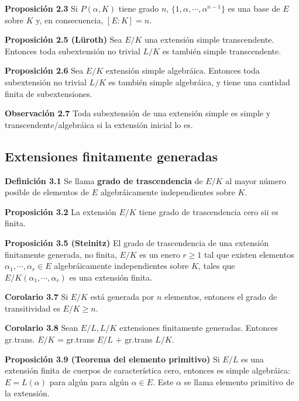 \documentclass[a4paper, 11pt]{extarticle}
\newcommand{\propo}[1]{\textcolor{rojo}{\textbf{Proposición #1}}}
\newcommand{\defi}[1]{\textcolor{azul}{\textbf{Definición #1}}}
\newcommand{\obs}[1]{\textcolor{verde}{\textbf{Observación #1}}}
\newcommand{\cor}[1]{\textcolor{rosa}{\textbf{Corolario #1}}}
\begin{document}
\begin{multicols*}{2}
\propo{2.3} Si \(P(\alpha,K)\) tiene grado \(n\), \(\{ 1, \alpha, \cdots,
\alpha^{n-1} \}\) es una base de \(E\) sobre \(K\) y, en consecuencia, \([E:K] = n\).

\propo{2.5 (Lüroth)} Sea \(E/K\) una extensión simple transcendente. Entonces
toda subextensión no trivial \(L/K\) es también simple transcendente. 

\propo{2.6} Sea \(E/K\) extensión simple algebráica. Entonces toda
subextensión no trivial \(L/K\) es también simple algebráica, y tiene una
cantidad finita de subextensiones.

\obs{2.7} Toda subextensión de una extensión simple es simple y
transcendente/algebráica si la extensión inicial lo es.

\subsection*{Extensiones finitamente generadas}
\label{sec:org444161c}
\defi{3.1} Se llama \textbf{grado de trascendencia} de \(E/K\) al mayor número
posible de elementos de \(E\) algebráicamente independientes sobre \(K\).

\propo{3.2} La extensión \(E/K\) tiene grado de trascendencia cero sii es
finita.

\propo{3.5 (Steinitz)} El grado de trascendencia de una extensión finitamente
generada, no finita, \(E/K\) es un enero \(r \ge 1\) tal que existen
elementos \(\alpha_1, \cdots, \alpha_r \in E\) algebráicamente independientes
sobre \(K\), tales que \(E/K(\alpha_1, \cdots, \alpha_r)\) es una extensión
finita. 

\cor{3.7} Si \(E/K\) está generada por \(n\) elementos, entonces el grado de
transitividad es \(E/K \ge n\).

\cor{3.8} Sean \(E/L, L/K\) extensiones finitamente generadas. Entonces
gr.trans. \(E/K\) = gr.trans \(E/L\) + gr.trans \(L/K\).

\propo{3.9 (Teorema del elemento primitivo)} Si \(E/L\) es una extensión
finita de cuerpos de característica cero, entonces es simple algebráica: \(E =
L(\alpha)\) para algún para algún \(\alpha \in E\). Este \(\alpha\) se
llama elemento primitivo de la extensión.



\end{multicols*}
\pagebreak
\end{document}
